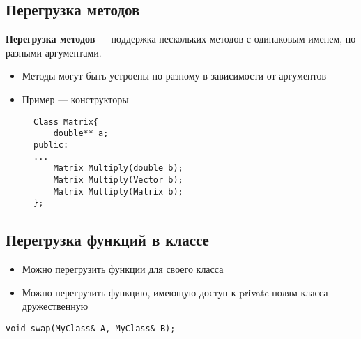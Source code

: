 \documentclass {article}
\begin{document}
\subsection{Перегрузка методов}
{\bfseries Перегрузка методов} --- поддержка нескольких методов с одинаковым именем, но разными аргументами.
\begin {itemize}
	\item Методы могут быть устроены по-разному в зависимости от аргументов
	\item Пример --- конструкторы
\end {itemize}
\begin{figure}[ht]
\begin{lstlisting}[caption=Перегрузка метода]
Class Matrix{
    double** a;
public:
...
    Matrix Multiply(double b);
    Matrix Multiply(Vector b);   
    Matrix Multiply(Matrix b);    
};
\end{lstlisting}
\end{figure}
\subsection{Перегрузка функций в классе}
\begin {itemize}
	\item Можно перегрузить функции для своего класса
	\item Можно перегрузить функцию, имеющую доступ к private-полям класса - дружественную
\end {itemize}
\begin{lstlisting}[caption=Перегрузка функции swap]
void swap(MyClass& A, MyClass& B);
\end{lstlisting}
\end{document}
